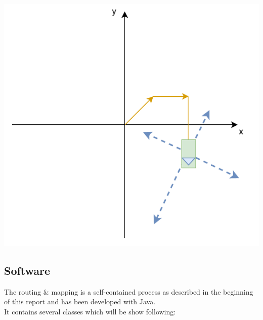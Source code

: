 \begin{center}
	\includegraphics[page=3,scale=0.6]{sources/mapping/orientation_objectdistance.pdf}
\end{center}

\newpage

\subsection{Software}

The routing \& mapping is a self-contained process as described in the beginning of this report and has been developed with Java.\\
It contains several classes which will be show following:

